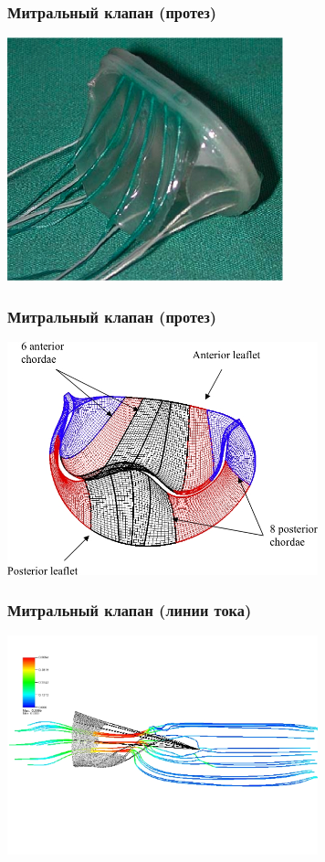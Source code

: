 \documentclass[14pt, notes]{beamer}
\begin{document}
\begin{frame}
\frametitle{Митральный клапан (протез)}
    \begin{center}
    \includegraphics[width=8cm]{immersed_boundary/prosthetic_MV.jpeg}
    \end{center}
\end{frame}

\begin{frame}
\frametitle{Митральный клапан (протез)}
    \begin{center}
    \includegraphics[width=9cm]{immersed_boundary/MV_mesh.jpeg}
    \end{center}
\end{frame}

\begin{frame}
\frametitle{Митральный клапан (линии тока)}
    \begin{center}
    \includegraphics[width=9cm]{immersed_boundary/MV_streamline_0030.jpeg}
    \end{center}
\end{frame}
\end{document}
